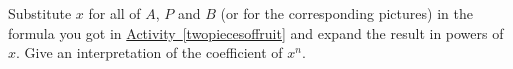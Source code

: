 \documentclass{book}
\begin{document}
\setcounter{cpjt}{237}
\addtocounter{cpjt}{-1}
\begin{activity}\label{activity-230}
\hypertarget{p-1258}{}%
Substitute \(x\) for all of \(A\), \(P\) and \(B\) (or for the corresponding pictures) in the formula you got in \hyperref[twopiecesoffruit]{Activity~\ref{twopiecesoffruit}} and expand the result in powers of \(x\). Give an interpretation of the coefficient of \(x^n\).%
\par\smallskip%
\noindent\end{activity}

\clearpage
\end{document}
